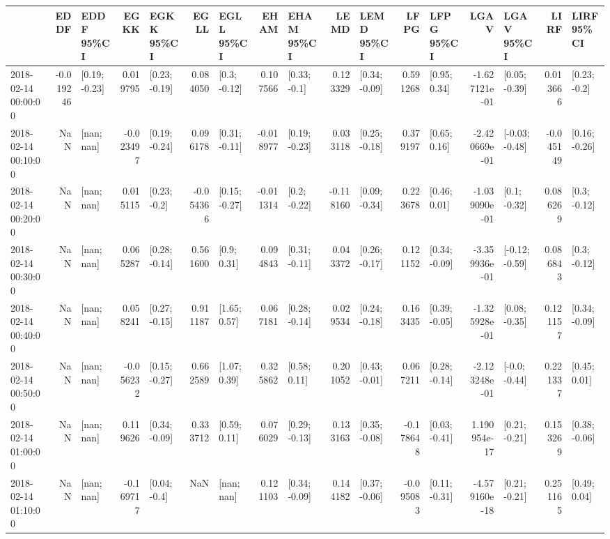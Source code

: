 \begin{tabular}{lrlrlrlrlrlrlrlrl}
\toprule
{} &      EDDF &      EDDF 95\%CI &      EGKK &      EGKK 95\%CI &      EGLL &      EGLL 95\%CI &      EHAM &      EHAM 95\%CI &      LEMD &      LEMD 95\%CI &      LFPG &      LFPG 95\%CI &          LGAV &      LGAV 95\%CI &      LIRF &      LIRF 95\%CI \\
\midrule
2018-02-14 00:00:00 & -0.019246 &   [0.19; -0.23] &  0.019795 &   [0.23; -0.19] &  0.084050 &    [0.3; -0.12] &  0.107566 &    [0.33; -0.1] &  0.123329 &   [0.34; -0.09] &  0.591268 &    [0.95; 0.34] & -1.627121e-01 &   [0.05; -0.39] &  0.013666 &    [0.23; -0.2] \\
2018-02-14 00:10:00 &       NaN &      [nan; nan] & -0.023497 &   [0.19; -0.24] &  0.096178 &   [0.31; -0.11] & -0.018977 &   [0.19; -0.23] &  0.033118 &   [0.25; -0.18] &  0.379197 &    [0.65; 0.16] & -2.420669e-01 &  [-0.03; -0.48] & -0.045149 &   [0.16; -0.26] \\
2018-02-14 00:20:00 &       NaN &      [nan; nan] &  0.015115 &    [0.23; -0.2] & -0.054366 &   [0.15; -0.27] & -0.011314 &    [0.2; -0.22] & -0.118160 &   [0.09; -0.34] &  0.223678 &    [0.46; 0.01] & -1.039090e-01 &    [0.1; -0.32] &  0.086269 &    [0.3; -0.12] \\
2018-02-14 00:30:00 &       NaN &      [nan; nan] &  0.065287 &   [0.28; -0.14] &  0.561600 &     [0.9; 0.31] &  0.094843 &   [0.31; -0.11] &  0.043372 &   [0.26; -0.17] &  0.121152 &   [0.34; -0.09] & -3.359936e-01 &  [-0.12; -0.59] &  0.086843 &    [0.3; -0.12] \\
2018-02-14 00:40:00 &       NaN &      [nan; nan] &  0.058241 &   [0.27; -0.15] &  0.911187 &    [1.65; 0.57] &  0.067181 &   [0.28; -0.14] &  0.029534 &   [0.24; -0.18] &  0.163435 &   [0.39; -0.05] & -1.325928e-01 &   [0.08; -0.35] &  0.121157 &   [0.34; -0.09] \\
2018-02-14 00:50:00 &       NaN &      [nan; nan] & -0.056232 &   [0.15; -0.27] &  0.662589 &    [1.07; 0.39] &  0.325862 &    [0.58; 0.11] &  0.201052 &   [0.43; -0.01] &  0.067211 &   [0.28; -0.14] & -2.123248e-01 &   [-0.0; -0.44] &  0.221337 &    [0.45; 0.01] \\
2018-02-14 01:00:00 &       NaN &      [nan; nan] &  0.119626 &   [0.34; -0.09] &  0.333712 &    [0.59; 0.11] &  0.076029 &   [0.29; -0.13] &  0.133163 &   [0.35; -0.08] & -0.178648 &   [0.03; -0.41] &  1.190954e-17 &   [0.21; -0.21] &  0.153269 &   [0.38; -0.06] \\
2018-02-14 01:10:00 &       NaN &      [nan; nan] & -0.169717 &    [0.04; -0.4] &       NaN &      [nan; nan] &  0.121103 &   [0.34; -0.09] &  0.144182 &   [0.37; -0.06] & -0.095083 &   [0.11; -0.31] & -4.579160e-18 &   [0.21; -0.21] &  0.251165 &    [0.49; 0.04] \\

\end{tabular}
